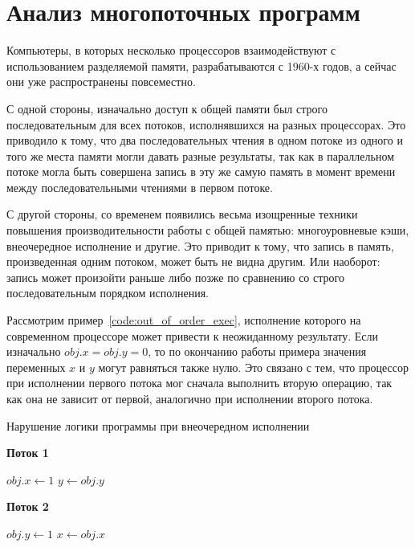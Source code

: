 \documentclass[14pt,titlepage,draft]{extarticle}
\newcommand{\algorithmictitle}[1]{\hspace{8mm}\textbf{#1}}
\begin{document}
  \section{Анализ многопоточных программ}
    \label{section:intro_to_multithreading}

    Компьютеры, в которых несколько процессоров взаимодействуют с
    использованием разделяемой памяти, разрабатываются с 1960-х годов, а
    сейчас они уже распространены повсеместно.

    С одной стороны, изначально доступ к общей памяти был строго
    последовательным для всех потоков, исполнявшихся на разных процессорах.
    Это приводило к тому, что два последовательных чтения в одном потоке из
    одного и того же места памяти могли давать разные результаты, так как в
    параллельном потоке могла быть совершена запись в эту же самую память в
    момент времени между последовательными чтениями в первом потоке.

    С другой стороны, со временем появились весьма изощренные техники
    повышения производительности работы с общей памятью: многоуровневые кэши,
    внеочередное исполнение  и другие.
    Это приводит к тому, что запись в память, произведенная одним потоком,
    может быть не видна другим. Или наоборот: запись может произойти раньше
    либо позже по сравнению со строго последовательным порядком исполнения.

    Рассмотрим пример~\ref{code:out_of_order_exec}, исполнение которого на
    современном процессоре может привести к неожиданному результату.
    Если изначально $obj.x = obj.y = 0$, то по окончанию работы примера
    значения переменных $x$ и $y$ могут равняться также нулю. Это связано с
    тем, что процессор при исполнении первого потока мог сначала выполнить
    вторую операцию, так как она не зависит от первой, аналогично при
    исполнении второго потока.

    \begin{algorithm}
      \caption{Нарушение логики программы при внеочередном исполнении}
      \label{code:out_of_order_exec}
      \begin{multicols}{2}
        \algorithmictitle{Поток 1}
        \begin{algorithmic}[1]
          \State $obj.x \gets 1$
          \State $y \gets obj.y$
        \end{algorithmic}
        \columnbreak
        \algorithmictitle{Поток 2}
        \begin{algorithmic}[1]
          \State $obj.y \gets 1$
          \State $x \gets obj.x$
        \end{algorithmic}
      \end{multicols}
    \end{algorithm}
\end{document}
